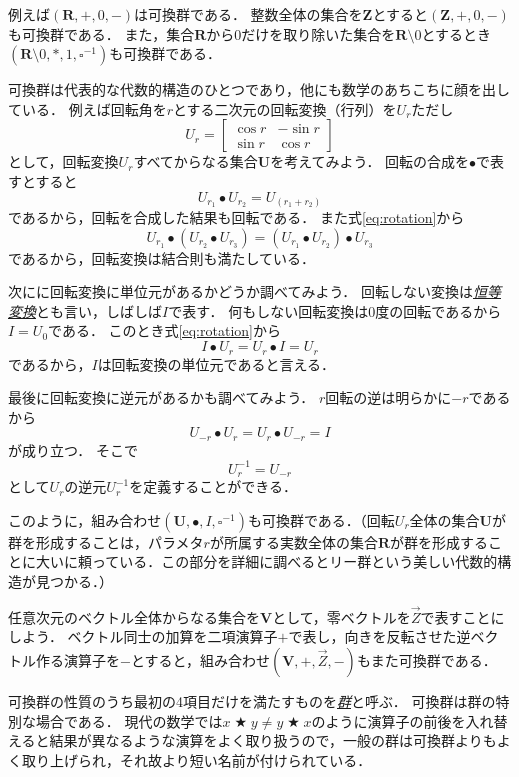 \documentclass[twocolumn]{jsbook}
\newcommand{\keyword}[1]{\underline{\emph{#1}}}
\DeclareMathOperator{\mathAnyBinaryOperator}{\bigstar}
\newcommand{\mathSomething}{\square}
\newcommand{\mathSet}[1]{\mathbf{#1}}
\newcommand{\mathVector}[1]{\vec{#1}}
\newcommand{\mathGroup}[4]{(#1,#2,#3,#4)}
\begin{document}
例えば$\mathGroup{\mathSet{R}}{+}{0}{-}$は可換群である．
整数全体の集合を$\mathSet{Z}$とすると$\mathGroup{\mathSet{Z}}{+}{0}{-}$も可換群である．
また，集合$\mathSet{R}$から$0$だけを取り除いた集合を$\mathSet{R}\setminus0$とするとき$\mathGroup{\mathSet{R}\setminus0}{*}{1}{\mathSomething^{-1}}$も可換群である．

可換群は代表的な代数的構造のひとつであり，他にも数学のあちこちに顔を出している．
例えば回転角を$r$とする二次元の回転変換（行列）を$U_r$ただし$$U_r=\begin{bmatrix}\cos r&-\sin r\\\sin r&\cos r\end{bmatrix}$$として，回転変換$U_r$すべてからなる集合$\mathSet{U}$を考えてみよう．
回転の合成を$\bullet$で表すとすると
\begin{equation}
\label{eq:rotation}
U_{r_1}\bullet U_{r_2}=U_{(r_1+r_2)}
\end{equation}
であるから，回転を合成した結果も回転である．
また式\eqref{eq:rotation}から$$U_{r_1}\bullet\left(U_{r_2}\bullet U_{r_3}\right)=\left(U_{r_1}\bullet U_{r_2}\right)\bullet U_{r_3}$$
であるから，回転変換は結合則も満たしている．

次にに回転変換に単位元があるかどうか調べてみよう．
回転しない変換は\keyword{恒等変換}とも言い，しばしば$I$で表す．
何もしない回転変換は$0$度の回転であるから$I=U_0$である．
このとき式\eqref{eq:rotation}から$$I\bullet U_r=U_r\bullet I=U_r$$であるから，$I$は回転変換の単位元であると言える．

最後に回転変換に逆元があるかも調べてみよう．
$r$回転の逆は明らかに$-r$であるから$$U_{-r}\bullet U_r=U_r\bullet U_{-r}=I$$が成り立つ．
そこで$$U_{r}^{-1}=U_{-r}$$として$U_r$の逆元$U_r^{-1}$を定義することができる．

このように，組み合わせ$\mathGroup{\mathSet{U}}{\bullet}{I}{\mathSomething^{-1}}$も可換群である．（回転$U_r$全体の集合$\mathSet{U}$が群を形成することは，パラメタ$r$が所属する実数全体の集合$\mathSet{R}$が群を形成することに大いに頼っている．この部分を詳細に調べるとリー群という美しい代数的構造が見つかる．）

任意次元のベクトル全体からなる集合を$\mathSet{V}$として，零ベクトルを$\mathVector{Z}$で表すことにしよう．
ベクトル同士の加算を二項演算子$+$で表し，向きを反転させた逆ベクトル作る演算子を$-$とすると，組み合わせ$\mathGroup{\mathSet{V}}{+}{\mathVector{Z}}{-}$もまた可換群である．

可換群の性質のうち最初の4項目だけを満たすものを\keyword{群}と呼ぶ．
可換群は群の特別な場合である．
現代の数学では$x\mathAnyBinaryOperator y\neq y\mathAnyBinaryOperator x$のように演算子の前後を入れ替えると結果が異なるような演算をよく取り扱うので，一般の群は可換群よりもよく取り上げられ，それ故より短い名前が付けられている．
\end{document}
